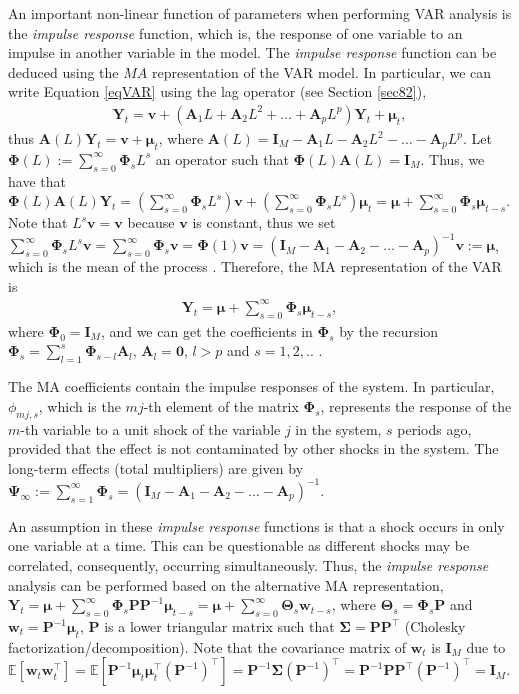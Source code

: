 An important non-linear function of parameters when performing VAR analysis is the \textit{impulse response} function, which is, the response of one variable to an impulse in another variable in the model. The \textit{impulse response} function can be deduced using the $MA$ representation of the VAR model. In particular, we can write Equation \ref{eqVAR} using the lag operator (see Section \ref{sec82}),
\begin{align}\label{eqVAR1}
	\bm{Y}_t=\bm{v} + (\bm{A}_{1}L+\bm{A}_{2}L^2+\dots+\bm{A}_{p}L^p)\bm{Y}_t+\bm{\mu}_t,
\end{align}
thus $\bm{A}(L)\bm{Y}_t=\bm{v}+\bm{\mu}_t$, where $\bm{A}(L)=\bm{I}_M-\bm{A}_{1}L-\bm{A}_{2}L^2-\dots-\bm{A}_{p}L^p$. Let $\bm{\Phi}(L):= \sum_{s=0}^{\infty}\bm{\Phi}_sL^s$ an operator such that $\bm{\Phi}(L)\bm{A}(L)=\bm{I}_M$. Thus, we have that  $\bm{\Phi}(L)\bm{A}(L)\bm{Y}_t=\left(\sum_{s=0}^{\infty}\bm{\Phi}_sL^s\right)\bm{v}+\left(\sum_{s=0}^{\infty}\bm{\Phi}_sL^s\right)\bm{\mu}_{t}=\bm{\mu}+\sum_{s=0}^{\infty}\bm{\Phi}_s\bm{\mu}_{t-s}$. Note that $L^s\bm{v}=\bm{v}$ because $\bm{v}$ is constant, thus we set $\sum_{s=0}^{\infty}\bm{\Phi}_sL^s\bm{v}=\sum_{s=0}^{\infty}\bm{\Phi}_s\bm{v}=\bm{\Phi}(1)\bm{v}=(\bm{I}_M-\bm{A}_{1}-\bm{A}_{2}-\dots-\bm{A}_{p})^{-1}\bm{v}:=\bm{\mu}$, which is the mean of the process \cite[Chap.~2]{helmut2005new}. Therefore, the MA representation of the VAR is
\begin{align}\label{eqMA}
	\bm{Y}_t=\bm{\mu} + \sum_{s=0}^{\infty}\bm{\Phi}_s\bm{\mu}_{t-s},
\end{align}
where $\bm{\Phi}_0=\bm{I}_M$, and we can get the coefficients in $\bm{\Phi}_s$ by the recursion $\bm{\Phi}_s=\sum_{l=1}^s\bm{\Phi}_{s-l}\bm{A}_l$, $\bm{A}_l=\bm{0}$, $l>p$ and $s=1,2,..$ \cite[Chap.~2]{helmut2005new}.

The MA coefficients contain the impulse responses of the system. In particular, $\phi_{mj,s}$, which is the $mj$-th element of the matrix $\bm{\Phi}_s$, represents the response of the $m$-th variable to a unit shock of the variable $j$ in the system, $s$ periods ago, provided that the effect is not contaminated by other shocks in the system. The long-term effects (total multipliers) are given by $\bm{\Psi}_{\infty}:=\sum_{s=1}^{\infty}\bm{\Phi}_s=(\bm{I}_M-\bm{A}_{1}-\bm{A}_{2}-\dots-\bm{A}_{p})^{-1}$.

An assumption in these \textit{impulse response} functions is that a shock occurs in only one variable at a time. This can be questionable as different shocks may be correlated, consequently, occurring simultaneously. Thus, the \textit{impulse response} analysis can be performed based on the alternative MA representation, $\bm{Y}_t=\bm{\mu} + \sum_{s=0}^{\infty}\bm{\Phi}_s\bm{P}\bm{P}^{-1}\bm{\mu}_{t-s}=\bm{\mu} + \sum_{s=0}^{\infty}\bm{\Theta}_s\bm{w}_{t-s}$, where $\bm{\Theta}_s=\bm{\Phi}_s\bm{P}$ and $\bm{w}_{t}=\bm{P}^{-1}\bm{\mu}_{t}$, $\bm{P}$ is a lower triangular matrix such that $\bm{\Sigma}=\bm{P}\bm{P}^{\top}$ (Cholesky factorization/decomposition). Note that the covariance matrix of $\bm{w}_t$ is $\bm{I}_M$ due to $\mathbb{E}[\bm{w}_t\bm{w}_t^{\top}]=\mathbb{E}[\bm{P}^{-1}\bm{\mu}_{t}\bm{\mu}_t^{\top}(\bm{P}^{-1})^{\top}]=\bm{P}^{-1}\bm{\Sigma}(\bm{P}^{-1})^{\top}=\bm{P}^{-1}\bm{P}\bm{P}^{\top}(\bm{P}^{-1})^{\top}=\bm{I}_M$. 

